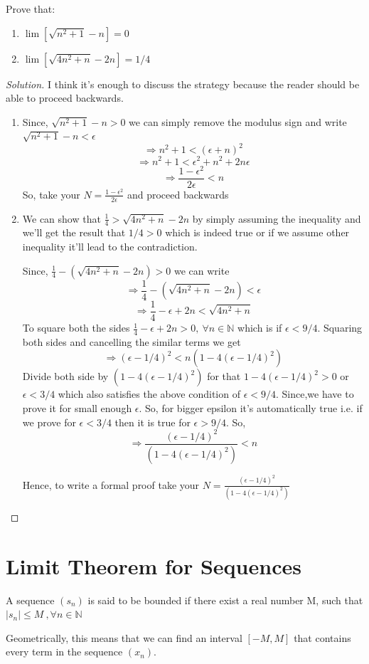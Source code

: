 \documentclass{notes}
\begin{document}
\begin{problem}
	Prove that:
	
	\begin{enumerate} %
		\item 
		$\lim [\sqrt{n^2 +1} - n] = 0$
		\item
		$\lim [\sqrt{4n^2 +n}- 2n] = 1/4$
	\end{enumerate}
\end{problem}
\begin{proof}[Solution]
	I think it's enough to discuss the strategy because the reader should be able to proceed backwards. 
	\begin{enumerate}
		
		\item
		Since, $\sqrt{n^2 +1} -n>0$ we can simply remove the modulus sign and write 
		$ \sqrt{n^2+1} - n <\epsilon$ 
		$$ \Rightarrow n^2 +1< (\epsilon+n)^2$$
		$$ \Rightarrow n^2 +1<  \epsilon^2 + n^2 + 2n\epsilon$$
		$$\Rightarrow \frac{1-\epsilon^2}{2\epsilon}<n$$
		So, take your $N =   \frac{1-\epsilon^2}{2\epsilon}$ and proceed backwards
		\item
		We can show that $\frac{1}{4}>\sqrt{4n^2 +n}- 2n$ by simply assuming the inequality and we'll get the result that $1/4>0$ which is indeed true or if we assume other inequality it'll lead to the contradiction.
		
		Since, $\frac{1}{4}-(\sqrt{4n^2 +n}- 2n)>0$ we can write
		$$\Rightarrow \frac{1}{4}-(\sqrt{4n^2 +n}- 2n) < \epsilon$$
		$$\Rightarrow \frac{1}{4}-\epsilon + 2n < \sqrt{4n^2 +n} $$
		To square both the sides $\frac{1}{4}-\epsilon + 2n >0,\ \forall n\in\mathbb{N}$ which is if $\epsilon<9 / 4$. Squaring both sides and cancelling the similar terms we get 
		$$ \Rightarrow (\epsilon-1 / 4)^2<n(1-4(\epsilon-1 / 4)^2) $$
		Divide both side by $(1-4(\epsilon-1 / 4)^2)$ for that $1-4(\epsilon-1 / 4)^2>0$ or $\epsilon<3/4$ which also satisfies the above condition of $\epsilon<9/4$.
		Since,we have to prove it for small enough $\epsilon$. So, for bigger epsilon it's automatically true i.e. if we prove for $\epsilon<3 / 4$ then it is true for $\epsilon>9 / 4$. So,
		$$\Rightarrow \frac{(\epsilon-1 / 4)^2}{(1-4(\epsilon-1 / 4)^2)}<n$$
		
		Hence, to write a formal proof take your $N = \frac{(\epsilon-1 / 4)^2}{(1-4(\epsilon-1 / 4)^2)}$
		
	\end{enumerate}
\end{proof}
\section{Limit Theorem for Sequences}
\begin{definition}{}
	A sequence $(s_n)$ is said to be bounded if there exist a real number M, such that $|s_n|\leq M\ , \forall n \in \mathbb{N} $
	
	Geometrically, this means that we can find an interval $[- M , M]$  that contains
	every term in the sequence $(x_n)$.
\end{definition}
\end{document}
